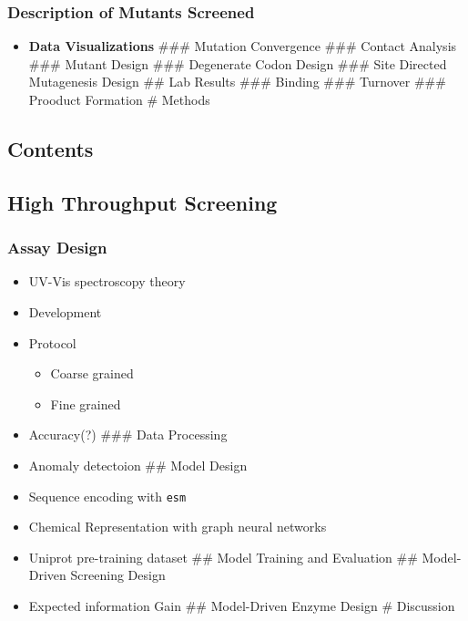 \hypertarget{description-of-mutants-screened}{%
\subsubsection{Description of Mutants
Screened}\label{description-of-mutants-screened}}

\begin{itemize}
\tightlist
\item
  \textbf{Data Visualizations} \#\#\# Mutation Convergence \#\#\#
  Contact Analysis \#\#\# Mutant Design \#\#\# Degenerate Codon Design
  \#\#\# Site Directed Mutagenesis Design \#\# Lab Results \#\#\#
  Binding \#\#\# Turnover \#\#\# Prooduct Formation \# Methods
\end{itemize}

\hypertarget{contents-15}{%
\subsection{Contents}\label{contents-15}}

\hypertarget{high-throughput-screening}{%
\subsection{High Throughput Screening}\label{high-throughput-screening}}

\hypertarget{assay-design}{%
\subsubsection{Assay Design}\label{assay-design}}

\begin{itemize}
\tightlist
\item
  UV-Vis spectroscopy theory
\item
  Development
\item
  Protocol

  \begin{itemize}
  \tightlist
  \item
    Coarse grained
  \item
    Fine grained
  \end{itemize}
\item
  Accuracy(?) \#\#\# Data Processing
\item
  Anomaly detectoion \#\# Model Design
\item
  Sequence encoding with \texttt{esm}
\item
  Chemical Representation with graph neural networks
\item
  Uniprot pre-training dataset \#\# Model Training and Evaluation \#\#
  Model-Driven Screening Design
\item
  Expected information Gain \#\# Model-Driven Enzyme Design \#
  Discussion
\end{itemize}

